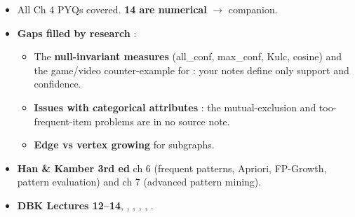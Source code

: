\begin{itemize}
  \item All Ch 4 PYQs covered. \textbf{14 are numerical} $\rightarrow$ companion.
  \item \textbf{Gaps filled by research} \added:
  \begin{itemize}
    \item The \textbf{null-invariant measures} (all\_conf, max\_conf, Kulc, cosine) and the
          game/video counter-example for : your notes define only support and confidence.
    \item \textbf{Issues with categorical attributes} : the mutual-exclusion and
          too-frequent-item problems are in no source note.
    \item \textbf{Edge vs vertex growing} for subgraphs.
  \end{itemize}
\end{itemize}

\begin{itemize}
  \item \textbf{Han \& Kamber 3rd ed} ch 6 (frequent patterns, Apriori, FP-Growth, pattern
        evaluation) and ch 7 (advanced pattern mining). 
  \item \textbf{DBK Lectures 12--14}, ,
        , ,
        , .
\end{itemize}

